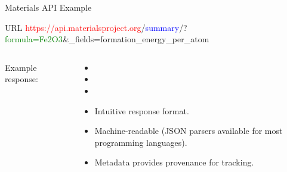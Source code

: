 \documentclass[aspectratio=169]{beamer}
\begin{document}
    \begin{frame}{Materials API Example}
        \begin{exampleblock}{URL}
            \footnotesize
            \textcolor{red}{https://api.materialsproject.org}/\textcolor{blue}{summary}/?\textcolor{green}{formula=Fe2O3}\&\_fields=formation\_energy\_per\_atom\\
        \end{exampleblock}
        \begin{columns}
            Example response:
            \inputminted{json}{mapi_response.txt}
            \begin{itemize}
                \item[]
                \item[]
                \item[]
                \item Intuitive response format.
                \item Machine-readable (JSON parsers available for most programming languages).
                \item Metadata provides provenance for tracking.
            \end{itemize}
        \end{columns}
    \end{frame}
\end{document}
